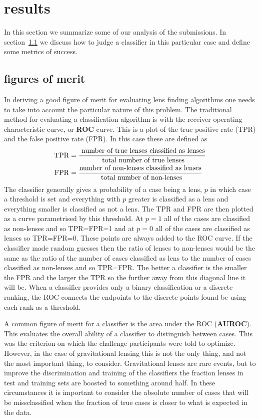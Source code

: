 \documentclass[useAMS,usenatbib]{mnras}
\begin{document}
\section{results}
\label{sec:results}

In this section we summarize some of our analysis of the submissions.  In section~\ref{sec:figure_of_merit} we discuss how to judge a classifier in this particular case and define some metrics of success.

\subsection{figures of merit}
\label{sec:figure_of_merit}

In deriving a good figure of merit for evaluating lens finding algorithms one needs to take into account the particular nature of this problem.
The traditional method for evaluating a classification algorithm is with the receiver operating characteristic curve, or {\bf ROC} curve.  This is a plot of the true positive rate (TPR) and the false positive rate (FPR).  In this case these are defined as
\begin{align}
{\rm TPR} &= \frac{\textrm{ number of true lenses classified as lenses}}{\textrm{ total number of true lenses}} \\
{\rm FPR} &= \frac{\textrm{number of non-lenses classified as lenses}}{\textrm{ total number of non-lenses}}
\end{align}
The classifier generally gives a probability of a case being a lens, $p$ in which case a threshold is set and everything with $p$ greater is classified as a lens and everything smaller is classified as not a lens.  The TPR and FPR are then plotted as a curve parametrised by this threshold.  At $p=1$ all of the cases are classified as non-lenses and so TPR=FPR=1 and at $p=0$ all of the cases are classified as lenses so TPR=FPR=0.  These points are always added to the ROC curve.  If the classifier made random guesses then the ratio of lenses to non-lenses would be the same as the ratio of the number of cases classified as lens to the number of cases classified as non-lenses and so TPR=FPR.  The better a classifier is the smaller the FPR and the larger the TPR so the further away from this diagonal line it will be.  When a classifier provides only a binary classification or a discrete ranking, the ROC connects the endpoints to the discrete points found be using each rank as a threshold.

A common figure of merit for a classifier is the area under the ROC ({\bf AUROC}).  This evaluates the overall ability of a classifier to distinguish between cases.  This was the criterion on which the challenge participants were told to optimize.  However, in the case of gravitational lensing this is not the only thing, and not the most important thing, to consider.  Gravitational lenses are rare events, but to improve the discrimination and training of the classifiers the fraction lenses in test and training sets are boosted to something around half.  In these circumstances it is important to consider the absolute number of cases that will be missclassified when the fraction of true cases is closer to what is expected in the data.
\end{document}
